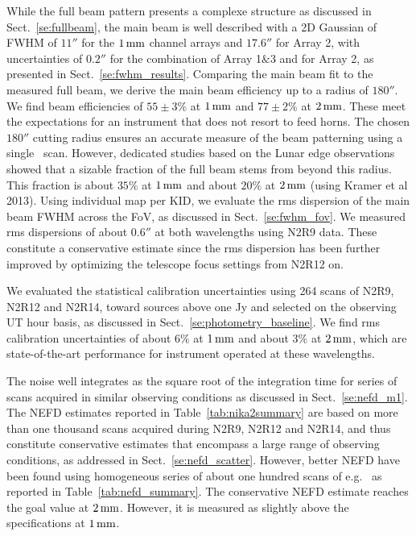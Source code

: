 While the full beam pattern presents a complexe structure as discussed
in Sect.~\ref{se:fullbeam}, the main beam is well described with a 2D
Gaussian of FWHM of $11''$ for the $1\,\rm{mm}$ channel arrays
and $17.6''$ for Array 2, with uncertainties of  $0.2''$ for the
combination of Array 1$\&$3 and for Array 2, as presented in
Sect.~\ref{se:fwhm_results}.
Comparing the main beam fit to the measured full beam, we derive the
main beam efficiency up to a radius of $180''$. We find beam
efficiencies of $55 \pm 3 \%$ at $1\,\rm{mm}$ and $77 \pm 2 \%$ at
$2\,\rm{mm}$. These meet the expectations for an instrument that does not
resort to feed horns. The chosen $180''$ cutting radius ensures an accurate
measure of the beam patterning using a single \bm\ scan. However,
dedicated studies based on the Lunar edge observations showed that
a sizable fraction of the full beam stems from beyond this
radius. This fraction is about $35\%$ at $1\,\rm{mm}$ and about $20\%$
at $2\,\rm{mm}$ (using Kramer et al 2013). Using individual map per
KID, we evaluate the rms dispersion of the main beam FWHM across the
FoV, as discussed in Sect.~\ref{se:fwhm_fov}. We measured rms
dispersions of about $0.6''$ at both wavelengths using N2R9 data. These
constitute a conservative estimate since the rms dispersion has been
further improved by optimizing the telescope focus settings from N2R12
on.  

We evaluated the statistical calibration uncertainties using 264 
scans of N2R9, N2R12 and N2R14, toward sources above one Jy and
selected on the observing UT hour basis, as discussed in
Sect.~\ref{se:photometry_baseline}. We find rms calibration
uncertainties of about $6\%$ at $1\,\rm{mm}$ and about $3\%$ at
$2\,\rm{mm}$, which are state-of-the-art performance for instrument
operated at these wavelengths. 


The noise well integrates as the square root of the integration time
for series of scans acquired in similar observing conditions as
discussed in Sect.~\ref{se:nefd_m1}. The NEFD estimates reported in
Table~\ref{tab:nika2summary} are based on more than one thousand scans
acquired during N2R9, N2R12 and N2R14, and thus constitute
conservative estimates that encompass a large range of observing
conditions, as addressed in Sect.~\ref{se:nefd_scatter}. However,
better NEFD have been found using homogeneous series of about one
hundred scans of e.g. \hls\, as reported in
Table~\ref{tab:nefd_summary}.  The conservative NEFD estimate reaches
the goal value at $2\,\rm{mm}$. However, it is measured as slightly
above the specifications at $1\,\rm{mm}$.

